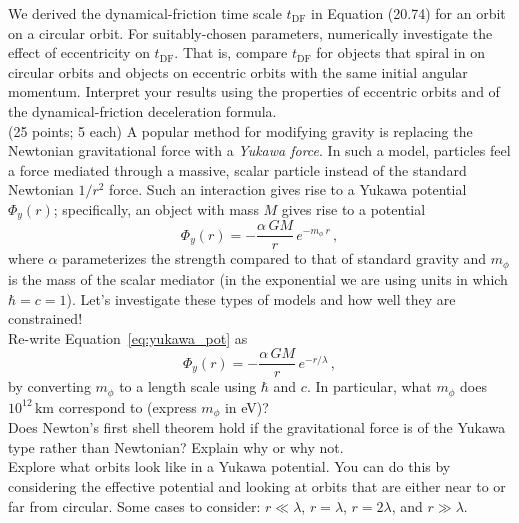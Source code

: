 \documentclass[12pt]{article}
\begin{document}
 We derived the dynamical-friction time scale $t_\mathrm{DF}$ in 
Equation (20.74) for an orbit on a circular orbit. For suitably-chosen parameters, 
numerically investigate the effect of eccentricity on $t_\mathrm{DF}$. That is, compare 
$t_\mathrm{DF}$ for objects that spiral in on circular orbits and objects on eccentric 
orbits with the same initial angular momentum. Interpret your results using the 
properties of eccentric orbits and of the dynamical-friction deceleration formula.\\

 (25 points; 5 each) A popular method for
modifying gravity is replacing the Newtonian gravitational force with
a \emph{Yukawa force}. In such a model, particles feel a force
mediated through a massive, scalar particle instead of the standard
Newtonian $1/r^2$ force. Such an interaction gives rise to a Yukawa
potential $\Phi_y(r)$; specifically, an object with mass $M$ gives
rise to a potential
\begin{equation}\label{eq:yukawa_pot}
  \Phi_y(r) = -\frac{\alpha\,GM}{r}\,e^{-m_\phi\,r}\,,
\end{equation}
where $\alpha$ parameterizes the strength compared to that of standard
gravity and $m_\phi$ is the mass of the scalar mediator (in the
exponential we are using units in which $\hbar = c = 1$). Let's
investigate these types of models and how well they are constrained!\\

 Re-write Equation~\eqref{eq:yukawa_pot} as
\begin{equation}
  \Phi_y(r) = -\frac{\alpha\,GM}{r}\,e^{-r/\lambda}\,,
\end{equation}
by converting $m_\phi$ to a length scale using $\hbar$ and $c$. In
particular, what $m_\phi$ does $10^{12}\,\mathrm{km}$ correspond to
(express $m_\phi$ in eV)?\\

 Does Newton's first shell theorem hold if the
gravitational force is of the Yukawa type rather than Newtonian?
Explain why or why not.\\

 Explore what orbits look like in a Yukawa
potential. You can do this by considering the effective potential and
looking at orbits that are either near to or far from circular. Some
cases to consider: $r \ll \lambda$, $r = \lambda$, $r = 2\lambda$, and
$r \gg \lambda$.\\
\end{document}
